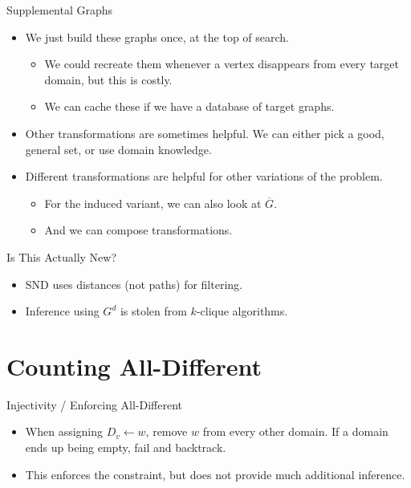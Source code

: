 \documentclass{beamer}
\begin{document}
\begin{frame}{Supplemental Graphs}
    \begin{itemize}
        \item We just build these graphs once, at the top of search.

            \begin{itemize}
                \item We could recreate them whenever a vertex disappears from every target domain,
                    but this is costly.

                \item We can cache these if we have a database of target graphs.
            \end{itemize}

        \item Other transformations are sometimes helpful. We can either pick a good, general set,
            or use domain knowledge.

        \item Different transformations are helpful for other variations of the problem.

            \begin{itemize}
                \item For the induced variant, we can also look at $\overline{G}$.
                \item And we can compose transformations.
            \end{itemize}
    \end{itemize}
\end{frame}

\begin{frame}{Is This Actually New?}
    \begin{itemize}
        \item SND uses distances (not paths) for filtering.

        \item Inference using $G^d$ is stolen from $k$-clique algorithms.
    \end{itemize}
\end{frame}

\section{Counting All-Different}

\frame{\sectionpage}

\begin{frame}{Injectivity / Enforcing All-Different}
    \begin{itemize}
        \item When assigning $D_v \gets w$, remove $w$ from every other domain. If a domain ends up
            being empty, fail and backtrack.

        \item This enforces the constraint, but does not provide much additional inference.
    \end{itemize}
\end{frame}
\end{document}
